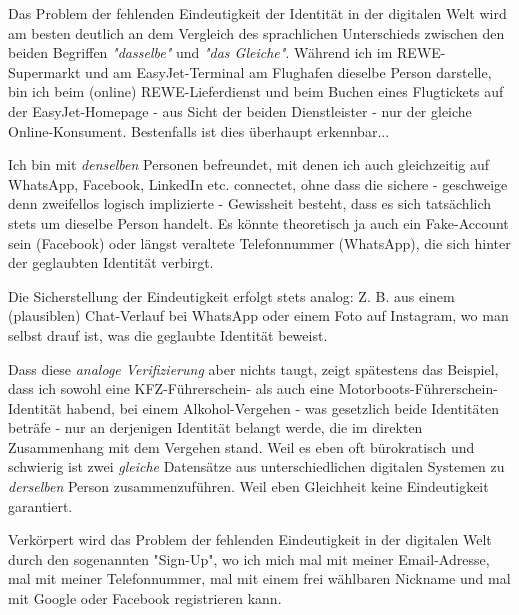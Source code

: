 \begin{Problem}

Das Problem der fehlenden Eindeutigkeit der Identität in der digitalen Welt wird am besten deutlich an dem Vergleich des sprachlichen Unterschieds zwischen den beiden Begriffen \textit{"dasselbe"} und \textit{"das Gleiche"}. Während ich im REWE-Supermarkt und am EasyJet-Terminal am Flughafen dieselbe Person darstelle, bin ich beim (online) REWE-Lieferdienst und beim Buchen eines Flugtickets auf der EasyJet-Homepage - aus Sicht der beiden Dienstleister - nur der gleiche Online-Konsument. Bestenfalls ist dies überhaupt erkennbar...

Ich bin mit \textit{denselben} Personen befreundet, mit denen ich auch gleichzeitig auf WhatsApp, Facebook, LinkedIn etc. connectet, ohne dass die sichere - geschweige denn zweifellos logisch implizierte - Gewissheit besteht, dass es sich tatsächlich stets um dieselbe Person handelt. Es könnte theoretisch ja auch ein Fake-Account sein (Facebook) oder längst veraltete Telefonnummer (WhatsApp), die sich hinter der geglaubten Identität verbirgt.

Die Sicherstellung der Eindeutigkeit erfolgt stets analog: Z. B. aus einem  (plausiblen) Chat-Verlauf bei WhatsApp oder einem Foto auf Instagram, wo man selbst drauf ist, was die geglaubte Identität beweist.

\vspace{0.2cm}

Dass diese \textit{analoge Verifizierung} aber nichts taugt, zeigt spätestens das Beispiel, dass ich sowohl eine KFZ-Führerschein- als auch eine Motorboots-Führerschein-Identität habend, bei einem Alkohol-Vergehen - was gesetzlich beide Identitäten beträfe - nur an derjenigen Identität belangt werde, die im direkten Zusammenhang mit dem Vergehen stand. Weil es eben oft bürokratisch und schwierig ist zwei \textit{gleiche} Datensätze aus unterschiedlichen digitalen Systemen zu \textit{derselben} Person zusammenzuführen. Weil eben Gleichheit keine Eindeutigkeit garantiert.

\vspace{0.2cm}

Verkörpert wird das Problem der fehlenden Eindeutigkeit in der digitalen Welt durch den sogenannten "Sign-Up", wo ich mich mal mit meiner Email-Adresse, mal mit meiner Telefonnummer, mal mit einem frei wählbaren Nickname und mal mit Google oder Facebook registrieren kann.

\end{Problem}

